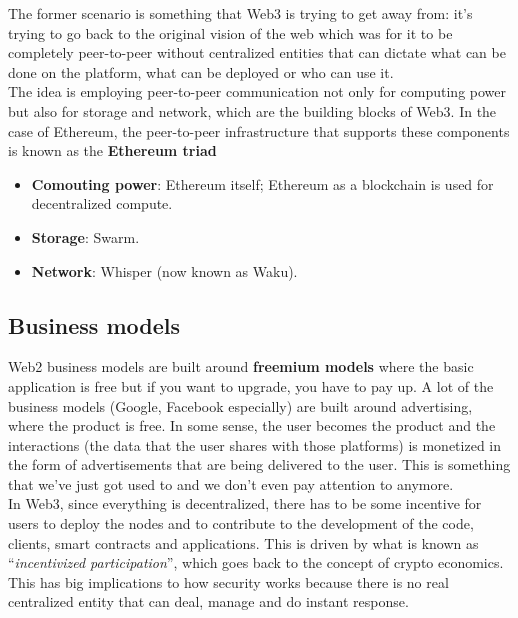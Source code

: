 The former scenario is something that Web3 is trying to get away from: it's trying to go back to the original vision of the web which was for it to be completely peer-to-peer without centralized entities that can dictate what can be done on the platform, what can be deployed or who can use it.\\

The idea is employing peer-to-peer communication not only for computing power but also for storage and network, which are the building blocks of Web3.
In the case of Ethereum, the peer-to-peer infrastructure that supports these components is known as the \textbf{Ethereum triad}

\begin{itemize}
    
    \item\textbf{Comouting power}: Ethereum itself; Ethereum as a blockchain is used for decentralized compute.
    
    \item\textbf{Storage}: Swarm.
    
    \item\textbf{Network}: Whisper (now known as Waku). 

\end{itemize}

\subsection*{Business models}

Web2 business models are built around \textbf{freemium models} where the basic application is free but if you want to upgrade, you have to pay up.
A lot of the business models (Google, Facebook especially) are built around advertising, where the product is free.
In some sense, the user becomes the product and the interactions (the data that the user shares with those platforms) is monetized in the form of advertisements that are being delivered to the user.
This is something that we've just got used to and we don't even pay attention to anymore.\\

In Web3, since everything is decentralized, there has to be some incentive for users to deploy the nodes and to contribute to the development of the code, clients, smart contracts and applications.
This is driven by what is known as ``\textit{incentivized participation}'', which goes back to the concept of crypto economics.
This has big implications to how security works because there is no real centralized entity that can deal, manage and do instant response.

